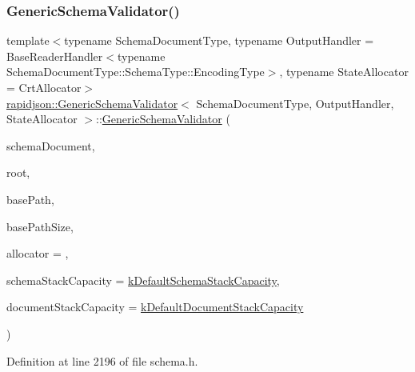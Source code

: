 \subsubsection{\texorpdfstring{GenericSchemaValidator()}{GenericSchemaValidator()}\hspace{0.1cm}{\footnotesize\ttfamily [3/3]}}
{\footnotesize\ttfamily template$<$typename Schema\+Document\+Type, typename Output\+Handler = Base\+Reader\+Handler$<$typename Schema\+Document\+Type\+::\+Schema\+Type\+::\+Encoding\+Type$>$, typename State\+Allocator = Crt\+Allocator$>$ \\
\mbox{\hyperlink{classrapidjson_1_1_generic_schema_validator}{rapidjson\+::\+Generic\+Schema\+Validator}}$<$ Schema\+Document\+Type, Output\+Handler, State\+Allocator $>$\+::\mbox{\hyperlink{classrapidjson_1_1_generic_schema_validator}{Generic\+Schema\+Validator}} (\begin{DoxyParamCaption}\item[{const Schema\+Document\+Type \&}]{schema\+Document,  }\item[{const \mbox{\hyperlink{classrapidjson_1_1_generic_schema_validator_a0619c9faf3014ef141d1c6d05ae04ddc}{Schema\+Type}} \&}]{root,  }\item[{const char $\ast$}]{base\+Path,  }\item[{size\+\_\+t}]{base\+Path\+Size,  }\item[{State\+Allocator $\ast$}]{allocator = {},  }\item[{size\+\_\+t}]{schema\+Stack\+Capacity = {\ttfamily \mbox{\hyperlink{classrapidjson_1_1_generic_schema_validator_ad11f6f1456ca3196a6ea4af85f0e7dca}{k\+Default\+Schema\+Stack\+Capacity}}},  }\item[{size\+\_\+t}]{document\+Stack\+Capacity = {\ttfamily \mbox{\hyperlink{classrapidjson_1_1_generic_schema_validator_aa80da69ff44fff7e6e62d2444359d4e6}{k\+Default\+Document\+Stack\+Capacity}}} }\end{DoxyParamCaption})\hspace{0.3cm}{\ttfamily [private]}}



Definition at line 2196 of file schema.\+h.


